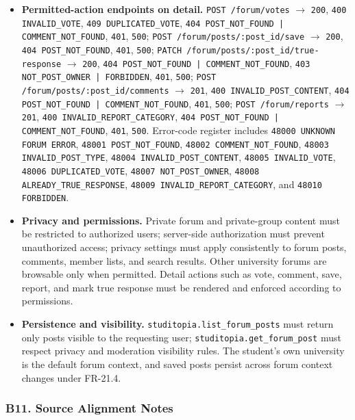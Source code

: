 \documentclass[12pt]{article}
\begin{document}
\begin{itemize}
\item \textbf{Permitted-action endpoints on detail.} \texttt{POST /forum/votes} $\rightarrow$ \texttt{200}, \texttt{400 INVALID\_VOTE}, \texttt{409 DUPLICATED\_VOTE}, \texttt{404 POST\_NOT\_FOUND | COMMENT\_NOT\_FOUND}, \texttt{401}, \texttt{500}; \texttt{POST /forum/posts/:post\_id/save} $\rightarrow$ \texttt{200}, \texttt{404 POST\_NOT\_FOUND}, \texttt{401}, \texttt{500}; \texttt{PATCH /forum/posts/:post\_id/true-response} $\rightarrow$ \texttt{200}, \texttt{404 POST\_NOT\_FOUND | COMMENT\_NOT\_FOUND}, \texttt{403 NOT\_POST\_OWNER | FORBIDDEN}, \texttt{401}, \texttt{500}; \texttt{POST /forum/posts/:post\_id/comments} $\rightarrow$ \texttt{201}, \texttt{400 INVALID\_POST\_CONTENT}, \texttt{404 POST\_NOT\_FOUND | COMMENT\_NOT\_FOUND}, \texttt{401}, \texttt{500}; \texttt{POST /forum/reports} $\rightarrow$ \texttt{201}, \texttt{400 INVALID\_REPORT\_CATEGORY}, \texttt{404 POST\_NOT\_FOUND | COMMENT\_NOT\_FOUND}, \texttt{401}, \texttt{500}. Error-code register includes \texttt{48000 UNKNOWN FORUM ERROR}, \texttt{48001 POST\_NOT\_FOUND}, \texttt{48002 COMMENT\_NOT\_FOUND}, \texttt{48003 INVALID\_POST\_TYPE}, \texttt{48004 INVALID\_POST\_CONTENT}, \texttt{48005 INVALID\_VOTE}, \texttt{48006 DUPLICATED\_VOTE}, \texttt{48007 NOT\_POST\_OWNER}, \texttt{48008 ALREADY\_TRUE\_RESPONSE}, \texttt{48009 INVALID\_REPORT\_CATEGORY}, and \texttt{48010 FORBIDDEN}.
\item \textbf{Privacy and permissions.} Private forum and private-group content must be restricted to authorized users; server-side authorization must prevent unauthorized access; privacy settings must apply consistently to forum posts, comments, member lists, and search results. Other university forums are browsable only when permitted. Detail actions such as vote, comment, save, report, and mark true response must be rendered and enforced according to permissions.
\item \textbf{Persistence and visibility.} \texttt{studitopia.list\_forum\_posts} must return only posts visible to the requesting user; \texttt{studitopia.get\_forum\_post} must respect privacy and moderation visibility rules. The student's own university is the default forum context, and saved posts persist across forum context changes under FR-21.4.
\end{itemize}
\par\medskip

\hypertarget{sec:b11-source-alignment-notes}{}
\subsubsection*{B11. Source Alignment Notes}
\par\medskip
\end{document}
